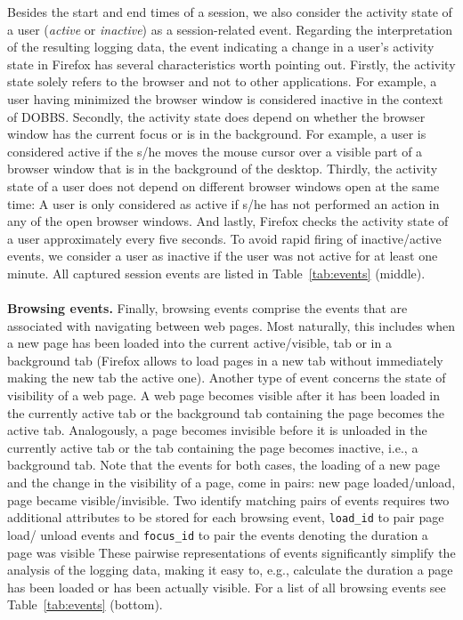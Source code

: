 \documentclass[11pt,fleqn,twoside]{article}
\begin{document}
Besides the start and end times of a session, we also consider the activity state of a user (\textit{active} or \textit{inactive}) as a session-related event. Regarding the interpretation of the resulting logging data, the event indicating a change in a user's activity state in Firefox has several characteristics worth pointing out. Firstly, the activity state solely refers to the browser and not to other applications. For example, a user having minimized the browser window is considered inactive in the context of DOBBS. Secondly, the activity state does depend on whether the browser window has the current focus or is in the background. For example, a user is considered active if the s/he moves the mouse cursor over a visible part of a browser window that is in the background of the desktop. Thirdly, the activity state of a user does not depend on different browser windows open at the same time: A user is only considered as active if s/he has not performed an action in any of the open browser windows. And 
lastly, Firefox checks the activity state of a user approximately every five seconds. To avoid rapid firing of inactive/active events, we consider a user as inactive if the user was not active for at least one minute. All captured session events are listed in Table~\ref{tab:events} (middle).
\\
\\
\textbf{Browsing events.}
Finally, browsing events comprise the events that are associated with navigating between web pages. Most naturally, this includes when a new page has been loaded into the current active/visible, tab or in a background tab (Firefox allows to load pages in a new tab without immediately making the new tab the active one). Another type of event concerns the state of visibility of a web page. A web page becomes visible after it has been loaded in the currently active tab or the background tab containing the page becomes the active tab. Analogously, a page becomes invisible before it is unloaded in the currently active tab or the tab containing the page becomes inactive, i.e., a background tab. Note that the events for both cases, the loading of a new page and the change in the visibility of a page, come in pairs: new page loaded/unload, page became visible/invisible. Two identify matching pairs of events requires two additional attributes to be stored for each browsing event, \texttt{load\_id} to pair page load/
unload events and \texttt{focus\_id} to pair the events denoting the duration a page was visible These pairwise representations of events significantly simplify the analysis of the logging data, making it easy to, e.g., calculate the duration a page has been loaded or has been actually visible. For a list of all browsing events see Table~\ref{tab:events} (bottom).
\end{document}
